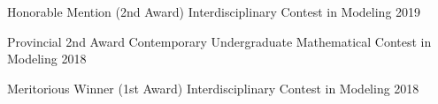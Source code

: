 

\begin{cvhonors}


  \cvhonor
    {Honorable Mention (2nd Award)} %
    {Interdisciplinary Contest in Modeling} %
    {} %
    {2019} %

  \cvhonor
    {Provincial 2nd Award} %
    {Contemporary Undergraduate Mathematical Contest in Modeling} %
    {} %
    {2018} %

  \cvhonor
    {Meritorious Winner (1st Award)} %
    {Interdisciplinary Contest in Modeling} %
    {} %
    {2018} %

\end{cvhonors}
